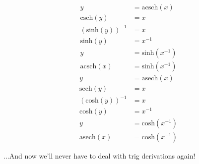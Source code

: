 \documentclass[10pt]{article}
\begin{document}
\begin{multicols}{2}
\begin{align*}
    y &= \mathrm{acsch}(x) \\
    \mathrm{csch}(y) &= x \\
    (\mathrm{sinh}(y))^{-1} &= x \\
    \mathrm{sinh}(y) &= x^{-1} \\
    y &= \mathrm{sinh}(x^{-1}) \\
    \mathrm{acsch}(x) &= \mathrm{sinh}(x^{-1})
\end{align*}
\begin{align*}
    y &= \mathrm{asech}(x) \\
    \mathrm{sech}(y) &= x \\
    (\mathrm{cosh}(y))^{-1} &= x \\
    \mathrm{cosh}(y) &= x^{-1} \\
    y &= \mathrm{cosh}(x^{-1}) \\
    \mathrm{asech}(x) &= \mathrm{cosh}(x^{-1})
\end{align*}

...And now we'll never have to deal with trig derivations again!

\end{multicols}
\end{document}
